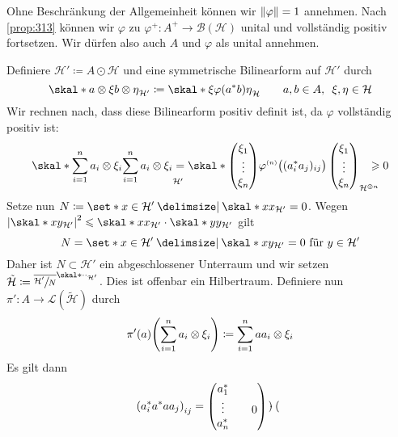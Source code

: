 \begin{beweis}
	Ohne Beschränkung der Allgemeinheit können wir $\norm*{\varphi} =1$ annehmen.
	Nach \autoref{prop:313} können wir $\varphi$ zu $\varphi^+ \colon A^+ \to \mathcal{B}(\mathcal{H})$ unital und vollständig positiv fortsetzen.
	Wir dürfen also auch $A$ und $\varphi$ als unital annehmen.
	
	Definiere $\mathcal{H}' \coloneqq A \odot \mathcal{H}$ und eine symmetrische Bilinearform auf $\mathcal{H}'$ durch
	\[
		\skal*{a \otimes \xi}{b \otimes \eta}_{\mathcal{H}'} \coloneqq \skal*{\xi}{\varphi(a^* b) \eta}_{\mathcal{H}} \qquad a,b \in A, \enspace \xi, \eta \in \mathcal{H}
	\]
	Wir rechnen nach, dass diese Bilinearform positiv definit ist, da $\varphi$ vollständig positiv ist:
	\[
		\skal*{\sum_{i=1}^{n} a_i \otimes \xi_i}{\sum_{i=1}^{n} a_i \otimes \xi_i}_{\mathcal{H}'}\hspace{-1em} = \skal*{\begin{pmatrix} \xi_1 \\ \vdots \\ \xi_n \end{pmatrix}}{\varphi^\ssbrace{n} \enbrace[\big]{(a_i^*a_j)_{ij}}\begin{pmatrix} \xi_1 \\ \vdots \\ \xi_n \end{pmatrix}}_{\mathcal{H}^{\oplus n}} \hspace{-1em}\ge 0
	\]
	Setze nun $N \coloneqq \set*{x \in \mathcal{H}' \given \skal*{x}{x}_{\mathcal{H}'} =0}$.
	Wegen $\abs*{\skal*{x}{y}_{\mathcal{H}'}}^2 \le \skal*{x}{x}_{\mathcal{H}'} \cdot \skal*{y}{y}_{\mathcal{H}'} $ gilt 
	\[
		N = \set*{x \in \mathcal{H}' \given \skal*{x}{y}_{\mathcal{H}'}=0 \text{ für } y \in \mathcal{H}'}
	\]
	Daher ist $N \subset \mathcal{H}'$ ein abgeschlossener Unterraum und wir setzen $\tilde{\mathcal{H}} \coloneqq \overline{\sfrac{\mathcal{H}'}{N}}^{\skal*{\cdot}{\cdot}_{\mathcal{H}'}}$.
	Dies ist offenbar ein Hilbertraum.
	Definiere nun $\pi' \colon A \to \mathcal{L}(\tilde{\mathcal{H}})$ durch
	\[
		\pi'(a) \enbrace*{\sum_{i=1}^{n} a_i \otimes \xi_i} \coloneqq \sum_{i=1}^{n} a a_i \otimes \xi_i
	\]
	Es gilt dann
	\begin{align}
		\enbrace*{a_i^* a^* aa_j}_{ij} &= \begin{pmatrix}
			a_1^* & & \\
			\vdots & & 0 \\
			a_n^* & & 
		\end{pmatrix} \cdot \begin{pmatrix}

\end{pmatrix}
\end{align}
\end{beweis}
